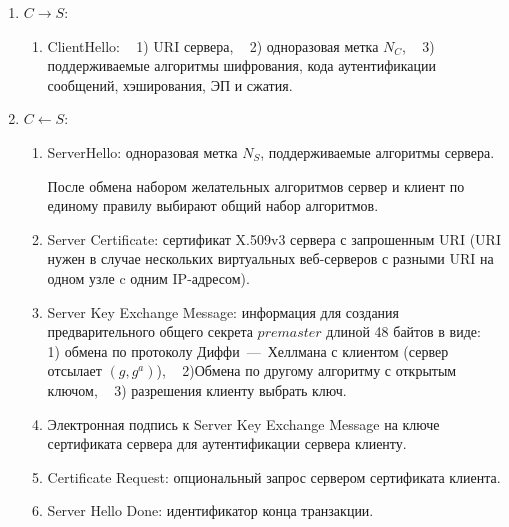 \begin{enumerate}
    \item $C \rightarrow S$:
        \begin{enumerate}
            \item ClientHello: ~ 1) URI сервера, ~ 2) одноразовая метка $N_C$, ~ 3) поддерживаемые алгоритмы шифрования, кода аутентификации сообщений, хэширования, ЭП и сжатия.
        \end{enumerate}

    \item $C \leftarrow S$:
        \begin{enumerate}
            \item ServerHello: одноразовая метка $N_S$, поддерживаемые алгоритмы сервера.

            После обмена набором желательных алгоритмов сервер и клиент по единому правилу выбирают общий набор алгоритмов.
            \item Server Certificate: сертификат X.509v3 сервера с запрошенным URI (URI нужен в случае нескольких виртуальных веб-серверов с разными URI на одном узле c одним IP-адресом).
            \item Server Key Exchange Message: информация для создания предварительного общего секрета $premaster$ длиной 48 байтов в виде: ~ 1) обмена по протоколу Диффи~---~Хеллмана с клиентом (сервер отсылает $(g, g^a)$), ~ 2)Обмена по другому алгоритму с открытым ключом, ~ 3) разрешения клиенту выбрать ключ.
            \item Электронная подпись к Server Key Exchange Message на ключе сертификата сервера для аутентификации сервера клиенту.
            \item Certificate Request: опциональный запрос сервером сертификата клиента.
            \item Server Hello Done: идентификатор конца транзакции.
        \end{enumerate}


\end{enumerate}
